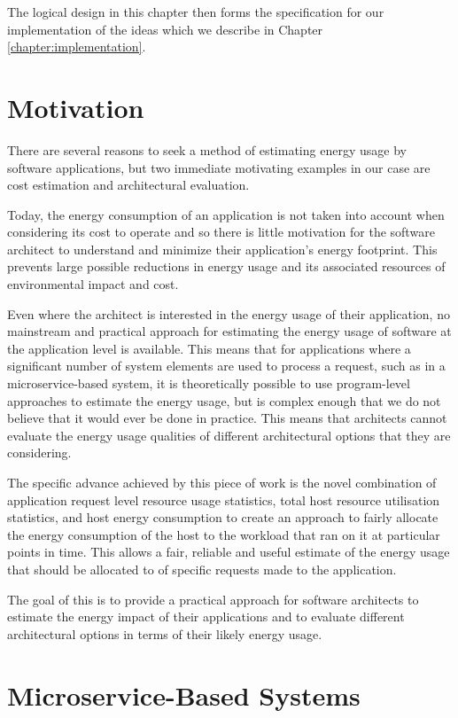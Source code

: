 The logical design in this chapter then forms the specification for our implementation of the ideas which we describe in Chapter \ref{chapter:implementation}.

\section{Motivation}

There are several reasons to seek a method of estimating energy usage by software applications, but two immediate motivating examples in our case are cost estimation and architectural evaluation.

Today, the energy consumption of an application is not taken into account when considering its cost to operate and so there is little motivation for the software architect to understand and minimize their application's energy footprint.  This prevents large possible reductions in energy usage and its associated resources of environmental impact and cost.

Even where the architect is interested in the energy usage of their application, no mainstream and practical approach for estimating the energy usage of software at the application level is available.  This means that for applications where a significant number of system elements are used to process a request, such as in a microservice-based system, it is theoretically possible to use program-level approaches to estimate the energy usage, but is complex enough that we do not believe that it would ever be done in practice.  This means that architects cannot evaluate the energy usage qualities of different architectural options that they are considering.

The specific advance achieved by this piece of work is the novel combination of application request level resource usage statistics, total host resource utilisation statistics, and host energy consumption to create an approach to fairly allocate the energy consumption of the host to the workload that ran on it at particular points in time.  This allows a fair, reliable and useful estimate of the energy usage that should be allocated to of specific requests made to the application.

The goal of this is to provide a practical approach for software architects to estimate the energy impact of their applications and to evaluate different architectural options in terms of their likely energy usage.

\section{Microservice-Based Systems}

